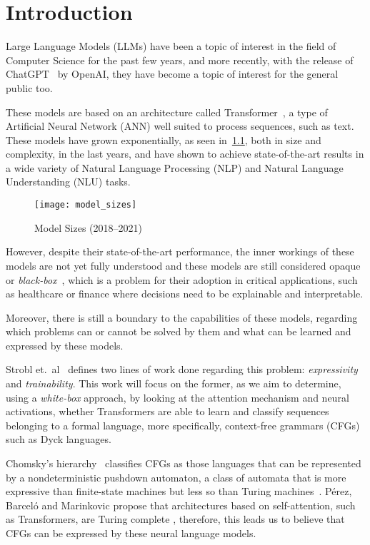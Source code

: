 \chapter{Introduction}

Large Language Models (LLMs) have been a topic of interest in the field of Computer Science for the past few years, 
and more recently, with the release of ChatGPT~\cite{chatgpt} by OpenAI, they have become a topic of interest for the general public too. 

These models are based on an architecture called Transformer~\cite{attention_is_all_you_need}, a type of Artificial Neural Network (ANN) 
well suited to process sequences, such as text. These models have grown exponentially, as seen in~\ref{fig:model_sizes}, both in size and complexity, in the last years, and 
have shown to achieve state-of-the-art results in a wide variety of Natural Language Processing (NLP) and Natural Language Understanding (NLU) tasks.

\begin{figure}[H]
    \centering
    \texttt{[image: model\_sizes]}
    \caption{Model Sizes (2018--2021)~\cite{model_sizes}}
    \label{fig:model_sizes}
\end{figure}

However, despite their state-of-the-art performance, the inner workings of these models are not yet fully understood and these models are still considered opaque or \emph{black-box}~\cite{lei-etal-2016-rationalizing}, which is a problem for their adoption in critical applications, such as healthcare or finance where decisions need to be explainable and interpretable. 

Moreover, there is still a boundary to the capabilities of these models, regarding which problems can or cannot be solved by them and what can be learned and expressed by these models.

Strobl et.\ al\ \cite{strobl2024formal} defines two lines of work done regarding this problem: \textit{expressivity} and \textit{trainability}. This work will focus on the former, as we aim to determine, using a \textit{white-box} approach, by looking at the attention mechanism and neural activations, whether Transformers are able to learn and classify sequences belonging to a formal language, more specifically, context-free grammars (CFGs) such as Dyck languages.

Chomsky's hierarchy\ \cite{chomsky-hierarchy} classifies CFGs as those languages that can be represented by a nondeterministic pushdown automaton, a class of automata that is more expressive than finite-state machines but less so than Turing machines~\cite{context-free-chomsky}. Pérez, Barceló and Marinkovic propose that architectures based on self-attention, such as Transformers, are Turing complete \cite{attention-tc}, therefore, this leads us to believe that CFGs can be expressed by these neural language models.

